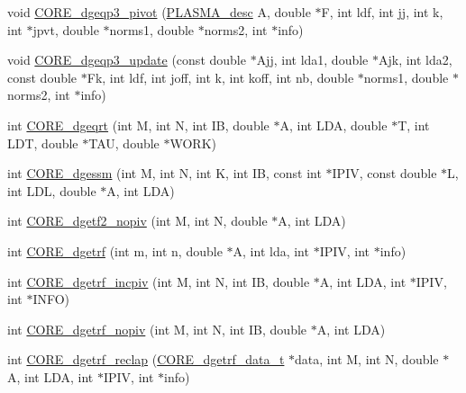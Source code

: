 \begin{DoxyCompactItemize}
\item 
void \hyperlink{group__CORE__double_gaf606d0b2de38604d78d13242d81b9824_gaf606d0b2de38604d78d13242d81b9824}{C\+O\+R\+E\+\_\+dgeqp3\+\_\+pivot} (\hyperlink{structplasma__desc__t}{P\+L\+A\+S\+M\+A\+\_\+desc} A, double $\ast$F, int ldf, int jj, int k, int $\ast$jpvt, double $\ast$norms1, double $\ast$norms2, int $\ast$info)
\item 
void \hyperlink{group__CORE__double_ga15093a96afb5bad4404f6b1d112d53f5_ga15093a96afb5bad4404f6b1d112d53f5}{C\+O\+R\+E\+\_\+dgeqp3\+\_\+update} (const double $\ast$Ajj, int lda1, double $\ast$Ajk, int lda2, const double $\ast$Fk, int ldf, int joff, int k, int koff, int nb, double $\ast$norms1, double $\ast$norms2, int $\ast$info)
\item 
int \hyperlink{group__CORE__double_gab8583bd4b0eb7a10fd9375f329a92b04_gab8583bd4b0eb7a10fd9375f329a92b04}{C\+O\+R\+E\+\_\+dgeqrt} (int M, int N, int I\+B, double $\ast$A, int L\+D\+A, double $\ast$T, int L\+D\+T, double $\ast$T\+A\+U, double $\ast$W\+O\+R\+K)
\item 
int \hyperlink{group__CORE__double_gaa343ed98ffecdd2a665c496662f47dd2_gaa343ed98ffecdd2a665c496662f47dd2}{C\+O\+R\+E\+\_\+dgessm} (int M, int N, int K, int I\+B, const int $\ast$I\+P\+I\+V, const double $\ast$L, int L\+D\+L, double $\ast$A, int L\+D\+A)
\item 
int \hyperlink{group__CORE__double_ga5150032fe134978e7ee6f8fc4a031a9d_ga5150032fe134978e7ee6f8fc4a031a9d}{C\+O\+R\+E\+\_\+dgetf2\+\_\+nopiv} (int M, int N, double $\ast$A, int L\+D\+A)
\item 
int \hyperlink{group__CORE__double_ga9fc744fcea215ec1d5a92452b2490fc4_ga9fc744fcea215ec1d5a92452b2490fc4}{C\+O\+R\+E\+\_\+dgetrf} (int m, int n, double $\ast$A, int lda, int $\ast$I\+P\+I\+V, int $\ast$info)
\item 
int \hyperlink{group__CORE__double_gab173cf6731777f03013286028c876ce7_gab173cf6731777f03013286028c876ce7}{C\+O\+R\+E\+\_\+dgetrf\+\_\+incpiv} (int M, int N, int I\+B, double $\ast$A, int L\+D\+A, int $\ast$I\+P\+I\+V, int $\ast$I\+N\+F\+O)
\item 
int \hyperlink{group__CORE__double_ga30400ad99aa04946859afdac1a716eff_ga30400ad99aa04946859afdac1a716eff}{C\+O\+R\+E\+\_\+dgetrf\+\_\+nopiv} (int M, int N, int I\+B, double $\ast$A, int L\+D\+A)
\item 
int \hyperlink{group__CORE__double_ga14a9a22ac40973261b22d2d299664fbe_ga14a9a22ac40973261b22d2d299664fbe}{C\+O\+R\+E\+\_\+dgetrf\+\_\+reclap} (\hyperlink{structCORE__dgetrf__data__s}{C\+O\+R\+E\+\_\+dgetrf\+\_\+data\+\_\+t} $\ast$data, int M, int N, double $\ast$A, int L\+D\+A, int $\ast$I\+P\+I\+V, int $\ast$info)

\end{DoxyCompactItemize}
